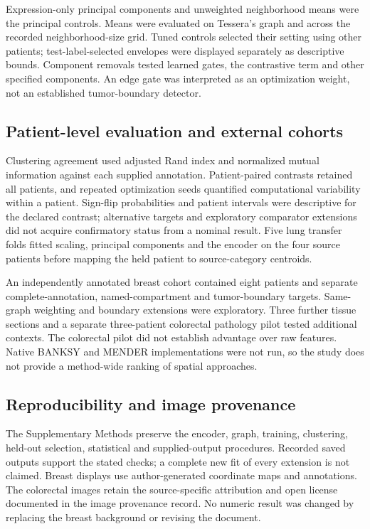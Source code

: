 \documentclass[11pt]{article}
\begin{document}
Expression-only principal components and unweighted neighborhood means were the principal controls. Means were evaluated on Tessera's graph and across the recorded neighborhood-size grid. Tuned controls selected their setting using other patients; test-label-selected envelopes were displayed separately as descriptive bounds. Component removals tested learned gates, the contrastive term and other specified components. An edge gate was interpreted as an optimization weight, not an established tumor-boundary detector.

\subsection{Patient-level evaluation and external cohorts}
Clustering agreement used adjusted Rand index and normalized mutual information against each supplied annotation. Patient-paired contrasts retained all patients, and repeated optimization seeds quantified computational variability within a patient. Sign-flip probabilities and patient intervals were descriptive for the declared contrast; alternative targets and exploratory comparator extensions did not acquire confirmatory status from a nominal result. Five lung transfer folds fitted scaling, principal components and the encoder on the four source patients before mapping the held patient to source-category centroids.

An independently annotated breast cohort contained eight patients and separate complete-annotation, named-compartment and tumor-boundary targets. Same-graph weighting and boundary extensions were exploratory. Three further tissue sections and a separate three-patient colorectal pathology pilot tested additional contexts. The colorectal pilot did not establish advantage over raw features. Native BANKSY and MENDER implementations were not run, so the study does not provide a method-wide ranking of spatial approaches.

\subsection{Reproducibility and image provenance}
The Supplementary Methods preserve the encoder, graph, training, clustering, held-out selection, statistical and supplied-output procedures. Recorded saved outputs support the stated checks; a complete new fit of every extension is not claimed. Breast displays use author-generated coordinate maps and annotations. The colorectal images retain the source-specific attribution and open license documented in the image provenance record. No numeric result was changed by replacing the breast background or revising the document.
\end{document}
